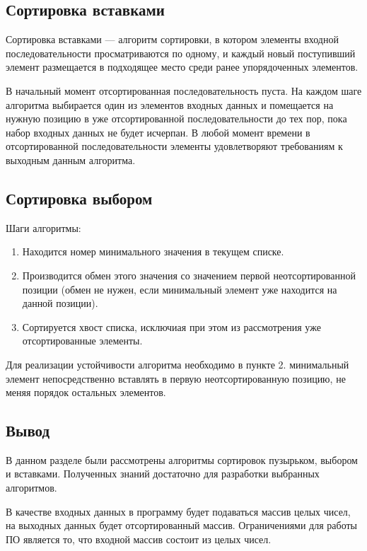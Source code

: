 \documentclass[14pt,russian]{scrartcl}
\begin{document}
\subsection{Сортировка вставками}

Сортировка вставками — алгоритм сортировки, в котором элементы входной последовательности просматриваются по одному, и каждый новый поступивший элемент размещается в подходящее место среди ранее упорядоченных элементов.


В начальный момент отсортированная последовательность пуста. На каждом шаге алгоритма выбирается один из элементов входных данных и помещается на нужную позицию в уже отсортированной последовательности до тех пор, пока набор входных данных не будет исчерпан. В любой момент времени в отсортированной последовательности элементы удовлетворяют требованиям к выходным данным алгоритма.

\subsection{Сортировка выбором}

Шаги алгоритмы:

\begin{enumerate}
    \item Находится номер минимального значения в текущем списке.
    \item Производится обмен этого значения со значением первой неотсортированной позиции (обмен не нужен, если минимальный элемент уже находится на данной позиции).
    \item Сортируется хвост списка, исключиая при этом из рассмотрения уже отсортированные элементы.
\end{enumerate}

Для реализации устойчивости алгоритма необходимо в пункте 2. минимальный элемент непосредственно вставлять в первую неотсортированную позицию, не меняя порядок остальных элементов.

\subsection{Вывод}

В данном разделе были рассмотрены алгоритмы сортировок пузырьком, выбором и вставками. Полученных знаний достаточно для разработки выбранных алгоритмов.

В качестве входных данных в программу будет подаваться массив целых чисел, на выходных данных будет отсортированный массив. Ограничениями для работы ПО является то, что входной массив состоит из целых чисел. 
\end{document}
